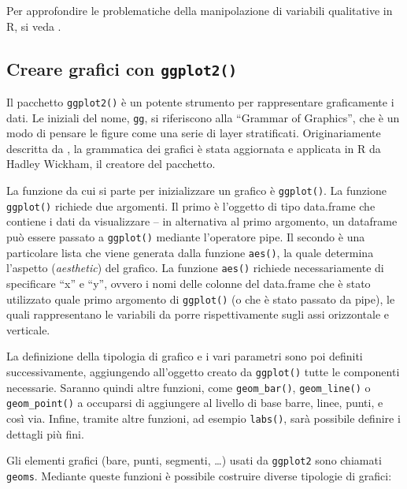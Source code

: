 \documentclass[
]{memoir}
\theoremstyle{definition}
\theoremstyle{definition}
\theoremstyle{definition}
\theoremstyle{definition}
\theoremstyle{remark}
\begin{document}
Per approfondire le problematiche della manipolazione di variabili qualitative in R, si veda \citet{mcnamara2018wrangling}.

\hypertarget{creare-grafici-con-ggplot2}{%
\subsection{\texorpdfstring{Creare grafici con \texttt{ggplot2()}}{Creare grafici con ggplot2()}}\label{creare-grafici-con-ggplot2}}

Il pacchetto \texttt{ggplot2()} è un potente strumento per rappresentare graficamente i dati. Le iniziali del nome, \texttt{gg}, si riferiscono alla ``Grammar of Graphics'', che è un modo di pensare le figure come una serie di layer stratificati. Originariamente descritta da \citet{wilkinson2012grammar}, la grammatica dei grafici è stata aggiornata e applicata in R da Hadley Wickham, il creatore del pacchetto.

La funzione da cui si parte per inizializzare un grafico è \texttt{ggplot()}. La funzione \texttt{ggplot()} richiede due argomenti. Il primo è l'oggetto di tipo data.frame che contiene i dati da visualizzare -- in alternativa al primo argomento, un dataframe può essere passato a \texttt{ggplot()} mediante l'operatore pipe. Il secondo è una particolare lista che viene generata dalla funzione \texttt{aes()}, la quale determina l'aspetto (\emph{aesthetic}) del grafico. La funzione \texttt{aes()} richiede necessariamente di specificare ``x'' e ``y'', ovvero i nomi delle colonne del data.frame che è stato utilizzato quale primo argomento di \texttt{ggplot()} (o che è stato passato da pipe), le quali rappresentano le variabili da porre rispettivamente sugli assi orizzontale e verticale.

La definizione della tipologia di grafico e i vari parametri sono poi definiti successivamente, aggiungendo all'oggetto creato da \texttt{ggplot()} tutte le componenti necessarie. Saranno quindi altre funzioni, come \texttt{geom\_bar()}, \texttt{geom\_line()} o \texttt{geom\_point()} a occuparsi di aggiungere al livello di base barre, linee, punti, e così via. Infine, tramite altre funzioni, ad esempio \texttt{labs()}, sarà possibile definire i dettagli più fini.

Gli elementi grafici (bare, punti, segmenti, \ldots) usati da \texttt{ggplot2} sono chiamati \texttt{geoms}. Mediante queste funzioni è possibile costruire diverse tipologie di grafici:
\end{document}
